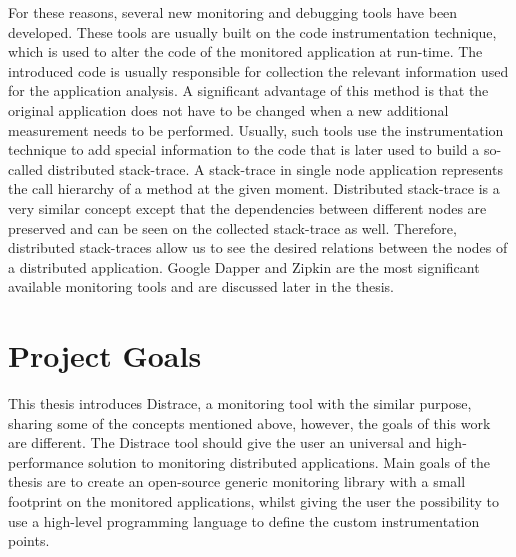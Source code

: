 For these reasons, several new monitoring and debugging tools have been developed. These tools are usually built on the code instrumentation technique, which is used to alter the code of the monitored application at run-time. The introduced code is usually responsible for collection the relevant information used for the application analysis. A significant advantage of this method is that the original application does not have to be changed when a new additional measurement needs to be performed. Usually, such tools use the instrumentation technique to add special information to the code that is later used to build a so-called distributed stack-trace. A stack-trace in single node application represents the call hierarchy of a method at the given moment. Distributed stack-trace is a very similar concept except that the dependencies between different nodes are preserved and can be seen on the collected stack-trace as well. Therefore, distributed stack-traces allow us to see the desired relations between the nodes of a distributed application. Google Dapper and Zipkin are the most significant available monitoring tools and are discussed later in the thesis. 


\section{Project Goals}
This thesis introduces Distrace, a monitoring tool with the similar purpose, sharing some of the concepts mentioned above, however, the goals of this work are different. The Distrace tool should give the user an universal and high-performance solution to monitoring distributed applications. Main goals of the thesis are to create an open-source generic monitoring library with a small footprint on the monitored applications, whilst giving the user the possibility to use a high-level programming language to define the custom instrumentation points.

